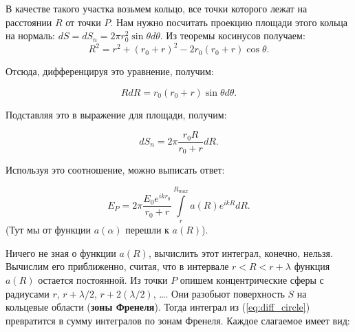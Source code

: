 \documentclass[12pt,a4paper]{article}
\numberwithin{equation}{section}
\numberwithin{equation}{section}
\begin{document}
\begin{figure}
  \begin{center}
  \end{center}
  \label{fig:diffraction_round}
\end{figure}

В качестве такого участка возьмем кольцо, все точки которого лежат на
расстоянии $R$ от точки $P$. Нам нужно посчитать проекцию площади
этого кольца на нормаль: $dS = dS_n = 2\pi r_0^2 \sin \theta d
\theta$. Из теоремы косинусов получаем:
\begin{equation}
R^2 = r^2 + (r_0 +r)^2 - 2r_0 (r_0 + r) \cos \theta.
\end{equation}

Отсюда, дифференцируя это уравнение, получим:

\begin{equation}
R dR = r_0 (r_0 + r) \sin \theta d \theta.
\end{equation}

Подставляя это в выражение для площади, получим: 

\begin{equation}
dS_n = 2 \pi \dfrac{r_0 R}{r_0 + r} dR.
\end{equation}

Используя это соотношение, можно выписать ответ:

\begin{equation} \label{eq:diff_circle}
E_P = 2 \pi \frac{E_0 e^{i k r_0}}{r_0 + r} \int\limits_{r}^{R_{max}} a(R) e^{i k R} dR.
\end{equation}
(Тут мы от функции $a(\alpha)$ перешли к $a(R)$).

Ничего не зная о функции $a(R)$, вычислить этот интеграл, конечно,
нельзя. Вычислим его приближенно, считая, что в интервале $r< R < r +
\lambda$ функция $a(R)$ остается постоянной. Из точки $P$ опишем
концентрические сферы с радиусами $r$, $r + \lambda /2$, $r + 2
(\lambda /2)$, \ldots. Они разобьют поверхность $S$ на кольцевые
области (\textbf{зоны Френеля}). Тогда интеграл из
(\ref{eq:diff_circle}) превратится в сумму интегралов по зонам
Френеля. Каждое слагаемое имеет вид:
\end{document}
